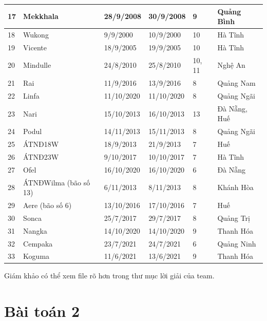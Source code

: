 \documentclass[12pt]{report}
\begin{document}
\begin{flushleft}
\begin{table}[!ht]
\begin{adjustbox}{width = 1.2\linewidth, center}
\begin{tabular}{|l|l|l|l|l|l|}
			17 & Mekkhala & 28/9/2008 & 30/9/2008 & 9 & Quảng Bình \\ \hline
			18 & Wukong & 9/9/2000 & 10/9/2000 & 10 & Hà Tĩnh \\ \hline
			19 & Vicente & 18/9/2005 & 19/9/2005 & 10 & Hà Tĩnh \\ \hline
			20 & Mindulle & 24/8/2010 & 25/8/2010 & 10, 11 & Nghệ An \\ \hline
			21 & Rai & 11/9/2016 & 13/9/2016 & 8 & Quảng Nam \\ \hline
			22 & Linfa & 11/10/2020 & 11/10/2020 & 8 & Quảng Ngãi \\ \hline
			23 & Nari & 15/10/2013 & 16/10/2013 & 13 & Đà Nẵng, Huế \\ \hline
			24 & Podul & 14/11/2013 & 15/11/2013 & 8 & Quảng Ngãi \\ \hline
			25 & ÁTNĐ\footnotemark[1] 18W & 18/9/2013 & 21/9/2013 & 7 & Huế \\ \hline
			26 & ÁTNĐ\footnotemark[1] 23W & 9/10/2017 & 10/10/2017 & 7 & Hà Tĩnh \\ \hline
			27 & Ofel & 16/10/2020 & 16/10/2020 & 6 & Đà Nẵng \\ \hline
			28 & ÁTNĐ\footnotemark[1] Wilma (bão số 13) & 6/11/2013 & 8/11/2013 & 8 & Khánh Hòa \\ \hline
			29 & Aere (bão số 6) & 13/10/2016 & 17/10/2016 & 7 & Huế \\ \hline
			30 & Sonca & 25/7/2017 & 29/7/2017 & 8 & Quảng Trị \\ \hline
			31 & Nangka & 14/10/2020 & 14/10/2020 & 9 & Thanh Hóa \\ \hline
			32 & Cempaka & 23/7/2021 & 24/7/2021 & 6 & Quảng Ninh \\ \hline
			33 & Koguma & 11/6/2021 & 13/6/2021 & 9 & Thanh Hóa \\ \hline

		\end{tabular}
		\end{adjustbox}
	\end{table}


	Giám khảo có thể xem file rõ hơn trong thư mục lời giải của team.
\end{flushleft}

\chapter{Bài toán 2} %
\label{cha:bài_toán_2}
\end{document}
